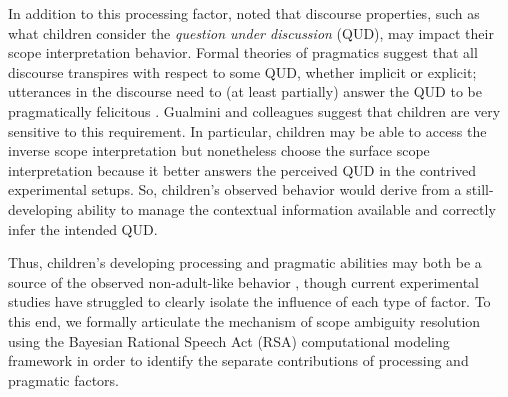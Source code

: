 \documentclass[10pt,a4paper]{article}
\begin{document}
In addition to this processing factor,  noted that discourse properties, such as what children consider the 
\textit{question under discussion} (QUD), 
may impact their scope interpretation behavior.  Formal theories of pragmatics suggest that all discourse transpires with respect to some QUD, whether implicit or explicit; utterances in the discourse need to (at least partially) answer the QUD to be pragmatically felicitous \cite{roberts2012information}. Gualmini and colleagues  suggest that children are very sensitive to this requirement.
In particular, children may be able to access the inverse scope interpretation but nonetheless choose the surface scope interpretation because it better answers the perceived QUD in the contrived experimental setups.  
So, children's observed behavior would derive from a still-developing ability to manage the contextual information available and correctly infer the intended QUD.

Thus, children's developing processing and pragmatic abilities may both be a source of the observed non-adult-like behavior \cite{viau2010priming},
though current experimental studies have struggled to clearly isolate the influence of each type of factor.
To this end, we formally articulate the mechanism of scope ambiguity resolution using the Bayesian Rational Speech Act (RSA) computational modeling framework  %
in order to identify the separate contributions of processing and pragmatic factors.
\end{document}
